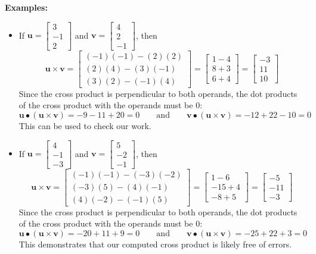\documentclass{article}
\begin{document}
\textbf{Examples:}
\begin{itemize}
\item If \(\mathbf{u} = \begin{bmatrix} 3 \\ -1 \\ 2 \end{bmatrix}\) and \(\mathbf{v} = \begin{bmatrix} 4 \\ 2 \\ -1 \end{bmatrix}\), then
\[\mathbf{u} \times \mathbf{v} = \begin{bmatrix} (-1)(-1) - (2)(2) \\ (2)(4) - (3)(-1) \\ (3)(2) - (-1)(4) \end{bmatrix} = \begin{bmatrix} 1 - 4 \\ 8 + 3 \\ 6 + 4 \end{bmatrix} = \begin{bmatrix} -3 \\ 11 \\ 10 \end{bmatrix}\]
Since the cross product is perpendicular to both operands, the dot products of the cross product with the operands must be \(0\):
\[\mathbf{u} \bullet (\mathbf{u} \times \mathbf{v}) = -9 - 11 + 20 = 0 \quad\quad\text{and}\quad\quad \mathbf{v} \bullet (\mathbf{u} \times \mathbf{v}) = -12 + 22 - 10 = 0\]
This can be used to check our work.
\item If \(\mathbf{u} = \begin{bmatrix} 4 \\ -1 \\ -3 \end{bmatrix}\) and \(\mathbf{v} = \begin{bmatrix} 5 \\ -2 \\ -1 \end{bmatrix}\), then
\[\mathbf{u} \times \mathbf{v} = \begin{bmatrix} (-1)(-1) - (-3)(-2) \\ (-3)(5) - (4)(-1) \\ (4)(-2) - (-1)(5) \end{bmatrix} = \begin{bmatrix} 1 - 6 \\ -15 + 4 \\ -8 + 5 \end{bmatrix} = \begin{bmatrix} -5 \\ -11 \\ -3 \end{bmatrix}\]
Since the cross product is perpendicular to both operands, the dot products of the cross product with the operands must be \(0\):
\[\mathbf{u} \bullet (\mathbf{u} \times \mathbf{v}) = -20 + 11 + 9 = 0 \quad\quad\text{and}\quad\quad \mathbf{v} \bullet (\mathbf{u} \times \mathbf{v}) = -25 + 22 + 3 = 0\]
This demonstrates that our computed cross product is likely free of errors.
\end{itemize}
\end{document}
